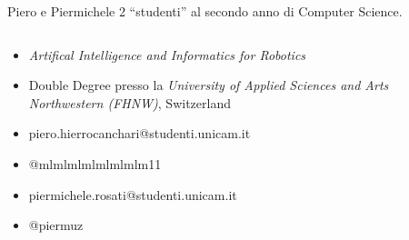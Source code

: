 \begin{frame}{Piero e Piermichele}
    2 ``studenti'' al secondo anno di Computer Science.
    \begin{columns}[t]
        \begin{column}{.5\textwidth}
          \begin{itemize}
            \item<1-> \textit{Artifical Intelligence and Informatics for Robotics}
            \item<2->[{\texttt{[image: img/swiss-flag.png]}}]  Double Degree presso la \textit{University of Applied Sciences and Arts Northwestern (FHNW)}, Switzerland
            \item<3->[{\texttt{[image: img/gmail-icon.png]}}]piero.hierrocanchari@studenti.unicam.it
            \item<3->[{\texttt{[image: img/telegram-logo.png]}}] @mlmlmlmlmlmlmlm11
            \vspace{0.2cm}
            \item<3->[{\texttt{[image: img/gmail-icon.png]}}] piermichele.rosati@studenti.unicam.it
            \item<3->[{\texttt{[image: img/telegram-logo.png]}}] @piermuz
          \end{itemize}
        \end{column}
        \begin{column}{.5\textwidth}
        \end{column}
      \end{columns}
    \end{frame}